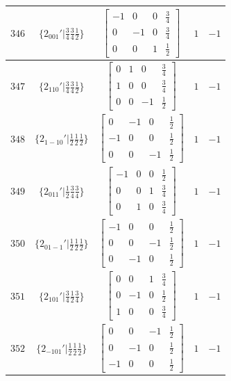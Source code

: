 \documentclass[fleqn,8pt]{jsarticle}
\begin{document}
\begin{longtable}{ccccc}
$ 346 $ & $ \{2{}_{001}{}'|\frac{3}{4} \frac{3}{4} \frac{1}{2}\} $ & $ \begin{bmatrix} -1 & 0 & 0 & \frac{3}{4} \\ 0 & -1 & 0 & \frac{3}{4} \\ 0 & 0 & 1 & \frac{1}{2} \end{bmatrix} $ & $ 1 $ & $ -1 $ \\ \hline
$ 347 $ & $ \{2{}_{110}{}'|\frac{3}{4} \frac{3}{4} \frac{1}{2}\} $ & $ \begin{bmatrix} 0 & 1 & 0 & \frac{3}{4} \\ 1 & 0 & 0 & \frac{3}{4} \\ 0 & 0 & -1 & \frac{1}{2} \end{bmatrix} $ & $ 1 $ & $ -1 $ \\ \hline
$ 348 $ & $ \{2{}_{1-10}{}'|\frac{1}{2} \frac{1}{2} \frac{1}{2}\} $ & $ \begin{bmatrix} 0 & -1 & 0 & \frac{1}{2} \\ -1 & 0 & 0 & \frac{1}{2} \\ 0 & 0 & -1 & \frac{1}{2} \end{bmatrix} $ & $ 1 $ & $ -1 $ \\ \hline
$ 349 $ & $ \{2{}_{011}{}'|\frac{1}{2} \frac{3}{4} \frac{3}{4}\} $ & $ \begin{bmatrix} -1 & 0 & 0 & \frac{1}{2} \\ 0 & 0 & 1 & \frac{3}{4} \\ 0 & 1 & 0 & \frac{3}{4} \end{bmatrix} $ & $ 1 $ & $ -1 $ \\ \hline
$ 350 $ & $ \{2{}_{01-1}{}'|\frac{1}{2} \frac{1}{2} \frac{1}{2}\} $ & $ \begin{bmatrix} -1 & 0 & 0 & \frac{1}{2} \\ 0 & 0 & -1 & \frac{1}{2} \\ 0 & -1 & 0 & \frac{1}{2} \end{bmatrix} $ & $ 1 $ & $ -1 $ \\ \hline
$ 351 $ & $ \{2{}_{101}{}'|\frac{3}{4} \frac{1}{2} \frac{3}{4}\} $ & $ \begin{bmatrix} 0 & 0 & 1 & \frac{3}{4} \\ 0 & -1 & 0 & \frac{1}{2} \\ 1 & 0 & 0 & \frac{3}{4} \end{bmatrix} $ & $ 1 $ & $ -1 $ \\ \hline
$ 352 $ & $ \{2{}_{-101}{}'|\frac{1}{2} \frac{1}{2} \frac{1}{2}\} $ & $ \begin{bmatrix} 0 & 0 & -1 & \frac{1}{2} \\ 0 & -1 & 0 & \frac{1}{2} \\ -1 & 0 & 0 & \frac{1}{2} \end{bmatrix} $ & $ 1 $ & $ -1 $ \\ \hline

\end{longtable}
\end{document}
